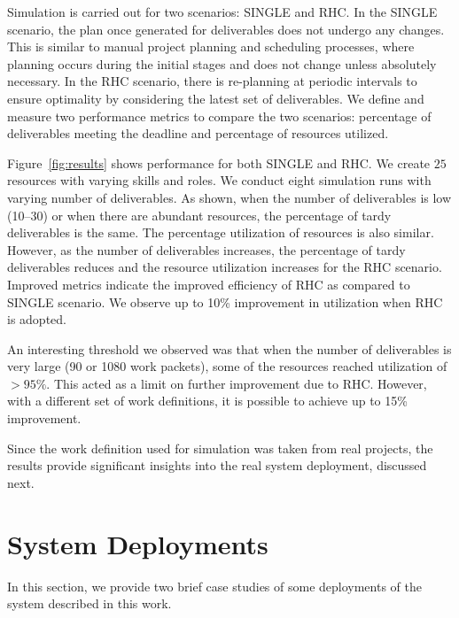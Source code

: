\documentclass[10pt,journal,cspaper,compsoc]{IEEEtran}
\begin{document}
Simulation is carried out for two scenarios: 
SINGLE and RHC. In the SINGLE scenario, the plan once generated for deliverables does not 
undergo any changes. This is similar to manual project planning and scheduling processes, 
where planning occurs during the initial stages and does not change unless absolutely 
necessary. In the RHC scenario, there is re-planning 
at periodic intervals to ensure optimality by considering the latest set of deliverables. 
We define and measure two performance metrics to compare the two scenarios: percentage of deliverables 
meeting the deadline and percentage of resources utilized. 

Figure~\ref{fig:results} shows performance for both SINGLE and RHC. We create $25$ 
resources with varying skills and roles. We conduct eight simulation runs with varying number of deliverables. 
As shown, when the number of deliverables is low (10--30) or when there are 
abundant resources, the percentage of tardy deliverables is the same. The percentage utilization
of resources is also similar. However, as the number of deliverables increases, the percentage 
of tardy deliverables reduces and the resource utilization increases for the RHC scenario. 
Improved metrics indicate the improved efficiency of RHC as compared to SINGLE scenario. 
We observe up to 10\% improvement in utilization when RHC is adopted. 

An interesting threshold 
we observed was that when the number of deliverables is very large (90 or 1080 work packets), 
some of the resources reached utilization of $> 95\%$. This acted as a limit on further 
improvement due to RHC. However, with a different set of work definitions, it is possible 
to achieve up to 15\% improvement. 

Since the work definition used for simulation was taken from 
real projects, the results provide significant insights into the real system deployment,
discussed next.

\section{System Deployments}
In this section, we provide two brief case studies of some deployments of the system described in this work.
\end{document}
